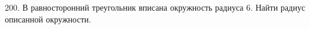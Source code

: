 200. В равносторонний треугольник вписана окружность радиуса 6. Найти радиус описанной окружности.\\

